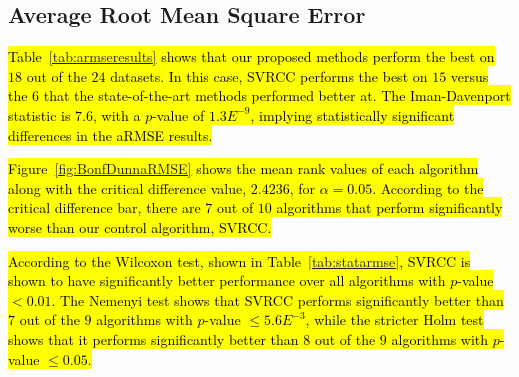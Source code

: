 \documentclass[preprint,12pt]{elsarticle}
\begin{document}
\subsection{Average Root Mean Square Error}\label{subsec:armse}
\hl{Table~{\ref{tab:armseresults}} shows that our proposed methods perform the best on $18$ out of the $24$ datasets. In this case, SVRCC performs the best on $15$ versus the $6$ that the state-of-the-art methods performed better at. The Iman-Davenport statistic is $7.6$, with a $p$-value of $1.3E^{-9}$, implying statistically significant differences in the aRMSE results.}

\hl{Figure~{\ref{fig:BonfDunnaRMSE}} shows the mean rank values of each algorithm along with the critical difference value, $2.4236$, for $\alpha = 0.05$. According to the critical difference bar, there are $7$ out of $10$ algorithms that perform significantly worse than our control algorithm, SVRCC.}

\hl{According to the Wilcoxon test, shown in Table~{\ref{tab:statarmse}}, SVRCC is shown to have significantly better performance over all algorithms with $p$-value $< 0.01$. The Nemenyi test shows that SVRCC performs significantly better than $7$ out of the $9$ algorithms with $p$-value $\leq 5.6E^{-3}$, while the stricter Holm test shows that it performs significantly better than $8$ out of the $9$ algorithms with $p$-value $\leq 0.05$.}
\end{document}
